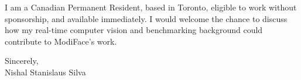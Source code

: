 \documentclass[11pt]{article}
\begin{document}
\vspace{1em}
\noindent
I am a Canadian Permanent Resident, based in Toronto, eligible to work without sponsorship, and available immediately. I would welcome the chance to discuss how my real-time computer vision and benchmarking background could contribute to ModiFace's work.

\vspace{1.5em}
\noindent
Sincerely, \\
Nishal Stanislaus Silva
\end{document}
